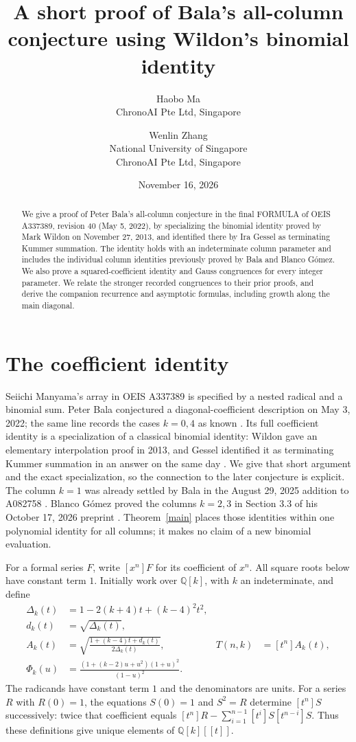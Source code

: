 \documentclass[11pt]{article}
\title{A short proof of Bala's all-column conjecture using Wildon's binomial identity}
\author{Haobo Ma\\\small ChronoAI Pte Ltd, Singapore
\and Wenlin Zhang\\\small National University of Singapore\\\small ChronoAI Pte Ltd, Singapore}
\date{November 16, 2026}
\begin{document}
\maketitle
\begin{abstract}
We give a proof of Peter Bala's all-column conjecture in the final
FORMULA of OEIS A337389, revision 40 (May 5, 2022), by specializing
the binomial identity proved by Mark Wildon on November 27, 2013,
and identified there by Ira Gessel as terminating Kummer summation.
The identity holds with an indeterminate column parameter and includes
the individual column identities previously proved by Bala and
Blanco G\'omez. We also prove a squared-coefficient identity and Gauss
congruences for every integer parameter. We relate the stronger recorded congruences to
their prior proofs, and derive the companion recurrence and asymptotic
formulas, including growth along the main diagonal.
\end{abstract}

\section{The coefficient identity}
Seiichi Manyama's array in OEIS A337389 is specified by a nested radical
and a binomial sum. Peter Bala conjectured a diagonal-coefficient
description on May 3, 2022; the same line records the cases $k=0,4$
as known \cite{array}. Its full coefficient identity is a specialization
of a classical binomial identity: Wildon gave an elementary interpolation
proof in 2013, and Gessel identified it as terminating Kummer summation
in an answer on the same day \cite{wildon,gessel2013}.
We give that short argument and the exact specialization, so the
connection to the later conjecture is explicit.
The column $k=1$ was already settled by Bala in the August 29, 2025
addition to A082758 \cite{columnone}. Blanco G\'omez proved the
columns $k=2,3$ in Section 3.3 of his October 17, 2026 preprint
\cite{blanco}. Theorem~\ref{main} places those identities within one
polynomial identity for all columns; it makes no claim of a new
binomial evaluation.

For a formal series $F$, write $[x^n]F$ for its coefficient of $x^n$.
All square roots below have constant term $1$. Initially work over
$\mathbb Q[k]$, with $k$ an indeterminate, and define
\begin{align}
 \Delta_k(t)&=1-2(k+4)t+(k-4)^2t^2,\nonumber\\
 d_k(t)&=\sqrt{\Delta_k(t)},\nonumber\\
 A_k(t)&=\sqrt{\frac{1+(k-4)t+d_k(t)}{2\Delta_k(t)}},
 &T(n,k)&=[t^n]A_k(t),\label{defA}\\
 \Phi_k(u)&=\frac{(1+(k-2)u+u^2)(1+u)^2}{(1-u)^2}.
 \label{defPhi}
\end{align}
The radicands have constant term $1$ and the denominators are units.
For a series $R$ with $R(0)=1$, the equations $S(0)=1$ and $S^2=R$
determine $[t^n]S$ successively: twice that coefficient equals
$[t^n]R-\sum_{i=1}^{n-1}[t^i]S[t^{n-i}]S$.
Thus these definitions give unique elements of $\mathbb Q[k][[t]]$.
\end{document}
